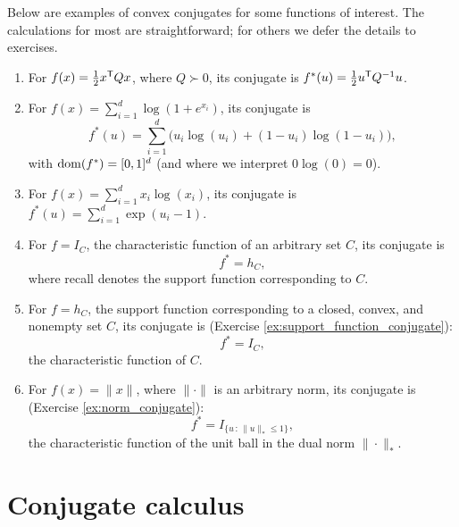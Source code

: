 \begin{Example}
Below are examples of convex conjugates for some functions of interest. The
calculations for most are straightforward; for others we defer the details to
exercises.   

\begin{enumerate}[label=\alph*., ref=\alph*]
\item {}
  For $f(x) = \frac{1}{2} x^{\mathsf{T}} Q x$, where $Q \succ 0$, its conjugate is $f^*(u)
  = \frac{1}{2} u^{\mathsf{T}} Q^{-1} u$.  

\item For $f(x) = \sum_{i=1}^d \log(1+e^{x_i})$, its conjugate is 
  \[
  f^*(u) = \sum_{i=1}^d \big( u_i \log(u_i) + (1-u_i) \log(1-u_i) \big), 
  \] 
  with $\operatorname{dom}(f^*) = [0,1]^d$ (and where we interpret $0 \log(0) = 0$). 

\item For $f(x) = \sum_{i=1}^d x_i \log(x_i)$, its conjugate is $f^*(u) =
  \sum_{i=1}^d \exp(u_i - 1)$. 

\item {}   
  For $f = I_C$, the characteristic function of an arbitrary set $C$, its
  conjugate is  
  \[
  f^* = h_C,
  \]
  where recall  denotes the support
  function corresponding to $C$.  

\item {} 
  For $f = h_C$, the support function corresponding to a closed, convex, and
  nonempty set $C$, its conjugate is (Exercise
  \ref{ex:support_function_conjugate}):    
  \[
  f^* = I_C,
  \]
  the characteristic function of $C$. 

\item {}  
  For $f(x) = \|x\|$, where $\|\cdot\|$ is an arbitrary norm, its conjugate is
  (Exercise \ref{ex:norm_conjugate}):  
  \[
  f^* = I_{\{u \,:\, \|u\|_* \leq 1\}},
  \]
  the characteristic function of the unit ball in the dual norm
  $\|\cdot\|_*$.
\end{enumerate}
\end{Example}

\section{Conjugate calculus}

